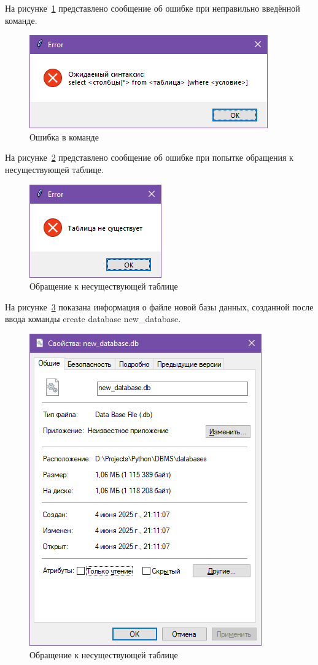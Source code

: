 На рисунке~\ref{fig:error} представлено сообщение об ошибке при неправильно введённой команде.
\begin{figure}[H]
	\centering
	\includegraphics[width=0.7\linewidth]{"images/ошибка"}
	\caption{Ошибка в команде}
	\label{fig:error}
\end{figure}

На рисунке~\ref{fig:error_table} представлено сообщение об ошибке при попытке обращения к несуществующей таблице.
\begin{figure}[H]
	\centering
	\includegraphics[width=0.7\linewidth]{"images/ошибка таблица"}
	\caption{Обращение к несуществующей таблице}
	\label{fig:error_table}
\end{figure}

На рисунке~\ref{fig:new_db} показана информация о файле новой базы данных, созданной после ввода команды create database new\_database.
\begin{figure}[H]
	\centering
	\includegraphics[width=0.7\linewidth]{"images/новая бд"}
	\caption{Обращение к несуществующей таблице}
	\label{fig:new_db}
\end{figure}

